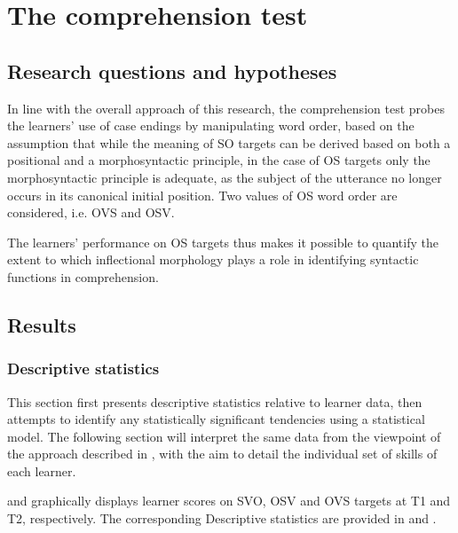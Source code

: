 \chapter{The comprehension test}\label{sec:4}

\section{Research questions and hypotheses}\label{sec:05:1}

In line with the overall approach of this research, the comprehension test probes the learners' use of case endings by manipulating word order, based on the assumption that while the meaning of SO targets can be derived based on both a positional and a morphosyntactic principle, in the case of OS targets only the morphosyntactic principle is adequate, as the subject of the utterance no longer occurs in its canonical initial position. Two values of OS word order are considered, i.e. OVS and OSV.

The learners’ performance on OS targets thus makes it possible to quantify the extent to which inflectional morphology plays a role in identifying syntactic functions in comprehension.

\section{Results}\label{sec:05:2}
\subsection{Descriptive statistics}\label{sec:05:2.1}

This section first presents descriptive statistics relative to learner data, then attempts to identify any statistically significant tendencies using a statistical model. The following section will interpret the same data from the viewpoint of the approach described in , with the aim to detail the individual set of skills of each learner.

 and  graphically displays learner scores on SVO, OSV and OVS targets at T1 and T2, respectively. The corresponding Descriptive statistics are provided in  and .

